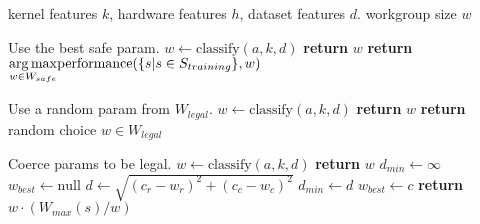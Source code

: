 \begin{algorithmic}[1]
\Require kernel features $k$, hardware features $h$, dataset features
$d$.
\Ensure workgroup size $w$

\Comment Use the best safe param.
\State $w \leftarrow \text{classify}(a, k, d)$
    \State \textbf{return} $w$
\Else
  \State \textbf{return} $\underset{w \in W_{safe}}{\operatorname*{arg\,max}} \text{performance}(\{s|s \in S_{training}\},w)$
\EndIf
\EndProcedure
\item[]

\Comment Use a random param from $W_{legal}$.
\State $w \leftarrow \text{classify}(a, k, d)$
    \State \textbf{return} $w$
\Else
  \State \textbf{return} random choice $w \in W_{legal}$
\EndIf
\EndProcedure
\item[]

\Comment Coerce params to be legal.
\State $w \leftarrow \text{classify}(a, k, d)$
    \State \textbf{return} $w$
\Else
  \State $d_{min} \leftarrow \infty$
  \State $w_{best} \leftarrow \text{null}$
    \State $d \leftarrow \sqrt{\left(c_r - w_r\right)^2 + \left(c_c - w_c\right)^2}$
      \State $d_{min} \leftarrow d$
      \State $w_{best} \leftarrow c$
    \EndIF
  \EndFor
  \State \textbf{return} $w \cdot (W_{max}(s) / w)$
\EndIf
\EndProcedure
\end{algorithmic}
